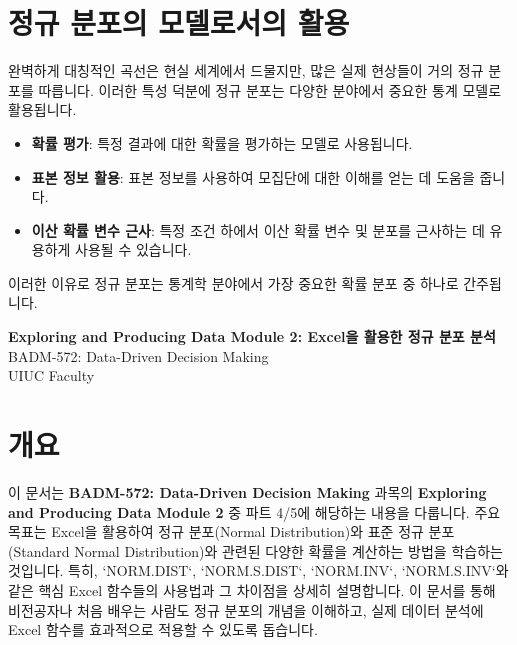 \documentclass[11pt,a4paper]{article}
\begin{document}
\newpage
\section*{정규 분포의 모델로서의 활용}
완벽하게 대칭적인 곡선은 현실 세계에서 드물지만, 많은 실제 현상들이 거의 정규 분포를 따릅니다. 이러한 특성 덕분에 정규 분포는 다양한 분야에서 중요한 통계 모델로 활용됩니다.

\begin{infobox}[정규 분포의 활용]
\begin{itemize}
    \item \textbf{확률 평가}: 특정 결과에 대한 확률을 평가하는 모델로 사용됩니다.
    \item \textbf{표본 정보 활용}: 표본 정보를 사용하여 모집단에 대한 이해를 얻는 데 도움을 줍니다.
    \item \textbf{이산 확률 변수 근사}: 특정 조건 하에서 이산 확률 변수 및 분포를 근사하는 데 유용하게 사용될 수 있습니다.
\end{itemize}
이러한 이유로 정규 분포는 통계학 분야에서 가장 중요한 확률 분포 중 하나로 간주됩니다.
\end{infobox}

\newpage

\begin{center}
    \Huge \textbf{Exploring and Producing Data Module 2: Excel을 활용한 정규 분포 분석} \\
    \vspace{1em}
    \Large BADM-572: Data-Driven Decision Making \\
    \large UIUC Faculty
\end{center}

\newpage
\tableofcontents
\newpage

\section{개요}
이 문서는 \textbf{BADM-572: Data-Driven Decision Making} 과목의 \textbf{Exploring and Producing Data Module 2} 중 파트 4/5에 해당하는 내용을 다룹니다.
주요 목표는 Excel을 활용하여 정규 분포(Normal Distribution)와 표준 정규 분포(Standard Normal Distribution)와 관련된 다양한 확률을 계산하는 방법을 학습하는 것입니다.
특히, `NORM.DIST`, `NORM.S.DIST`, `NORM.INV`, `NORM.S.INV`와 같은 핵심 Excel 함수들의 사용법과 그 차이점을 상세히 설명합니다.
이 문서를 통해 비전공자나 처음 배우는 사람도 정규 분포의 개념을 이해하고, 실제 데이터 분석에 Excel 함수를 효과적으로 적용할 수 있도록 돕습니다.

\newpage
\end{document}
